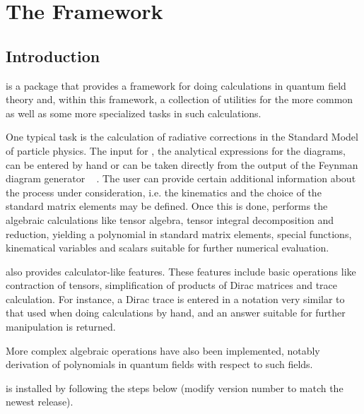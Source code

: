 \chapter{The \fc Framework}

\section{Introduction}
\label{intro}

\fc is a \mma package that provides a framework for doing calculations
in quantum field theory and, within this framework, a collection of utilities
for the more common as well as some more specialized tasks
in such calculations.

One typical task is the calculation of
radiative corrections in the Standard Model of particle physics. 
The input for \fc, the analytical expressions for the diagrams, can be 
entered by hand or can be taken directly from the output of the Feynman diagram generator \fa\ \cite{feynarts} .
The user can provide certain additional  information about the process 
under consideration, i.e. the kinematics and the choice of the standard 
matrix elements may be defined. Once this is done, \fc performs the 
algebraic calculations like tensor algebra, tensor integral decomposition and reduction,
yielding a polynomial in standard matrix elements,  special functions, kinematical 
variables and scalars suitable for further numerical evaluation.

\fc also provides calculator-like features.
These features include basic operations like contraction of
tensors, simplification of products of Dirac matrices and trace calculation.
For instance, a Dirac trace is entered
in a notation very similar to that used when doing calculations by hand, and 
an answer suitable for further manipulation is returned.

More complex algebraic operations have also been implemented, notably derivation
of polynomials in quantum fields with respect to such fields.

\fc is installed by following the steps below (modify version number to match
the newest release).


